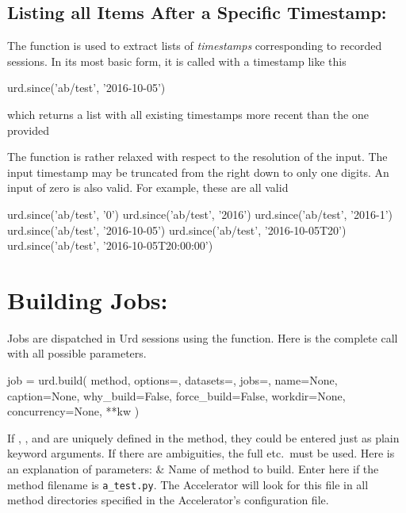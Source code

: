 \subsection{Listing all Items After a Specific Timestamp:  }
The  function is used to extract lists
of \textsl{timestamps} corresponding to recorded sessions.  In its
most basic form, it is called with a timestamp like this
\begin{python}
urd.since('ab/test', '2016-10-05')
\end{python}
which returns a list with all existing timestamps more recent than the
one provided
\begin{shell}
['2016-10-06', '2016-10-07', '2016-10-08', '2016-10-09', '2016-10-09T20']
\end{shell}
The  function is rather relaxed with respect to the
resolution of the input.  The input timestamp may be truncated from
the right down to only one digits.  An input of zero is also valid.
For example, these are all valid
\begin{python}
urd.since('ab/test', '0')
urd.since('ab/test', '2016')
urd.since('ab/test', '2016-1')
urd.since('ab/test', '2016-10-05')
urd.since('ab/test', '2016-10-05T20')
urd.since('ab/test', '2016-10-05T20:00:00')
\end{python}





\section{Building Jobs: }
\label{sec:urd_build}

Jobs are dispatched in Urd sessions using the  function.
Here is the complete call with all possible parameters.
\begin{python}
job = urd.build(
    method,
    options={}, datasets={}, jobs={},
    name=None, caption=None,
    why_build=False,
    force_build=False,
    workdir=None,
    concurrency=None,
    **kw
)
\end{python}
If \options, \datasets, and \jobs are uniquely defined in the method,
they could be entered just as plain keyword arguments.  If there are
ambiguities, the full  etc.\ must be used.  Here is
an explanation of  parameters:
\starttabletwo
\RPtwo {} & Name of method to build.  Enter 
    here if the method filename is \texttt{a\_test.py}.  The
    Accelerator will look for this file in all method directories
    specified in the Accelerator's configuration file.\\

